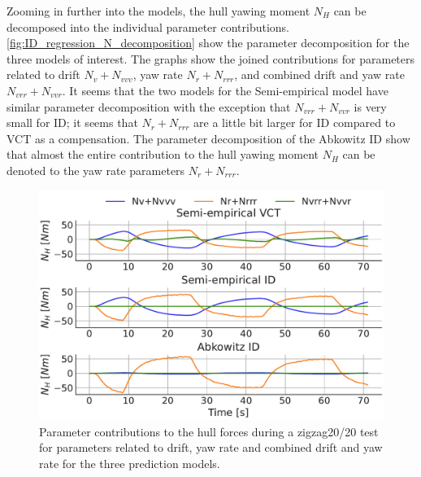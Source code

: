 Zooming in further into the models, the hull yawing moment $N_H$ can be decomposed into the individual parameter contributions. \autoref{fig:ID_regression_N_decomposition} show the parameter decomposition for the three models of interest. The graphs show the joined contributions for parameters related to drift $N_v+N_{vvv}$, yaw rate $N_r+N_{rrr}$, and combined drift and yaw rate $N_{vrr}+N_{vvr}$. It seems that the two models for the Semi-empirical model have similar parameter decomposition with the exception that $N_{vrr}+N_{vvr}$ is very small for ID; it seems that $N_r+N_{rrr}$ are a little bit larger for ID compared to VCT as a compensation.
The parameter decomposition of the Abkowitz ID show that almost the entire contribution to the hull yawing moment $N_H$ can be denoted to the yaw rate parameters $N_r+N_{rrr}$. 
\begin{figure}[h!]
    \includegraphics[width=\columnwidth]{figures/result_ID_regression.ID_regression_N_decomposition.pdf}
    \caption{Parameter contributions to the hull forces during a zigzag20/20 test for parameters related to drift, yaw rate and combined drift and yaw rate for the three prediction models.}
    \label{fig:ID_regression_N_decomposition}
\end{figure}